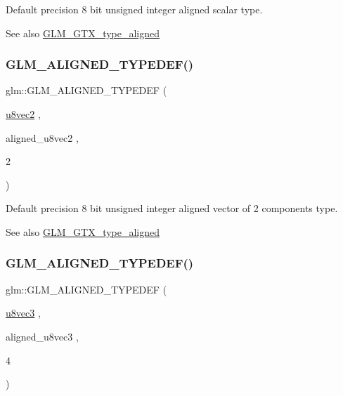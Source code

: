 Default precision 8 bit unsigned integer aligned scalar type. \begin{DoxySeeAlso}{See also}
\mbox{\hyperlink{group__gtx__type__aligned}{G\+L\+M\+\_\+\+G\+T\+X\+\_\+type\+\_\+aligned}} 
\end{DoxySeeAlso}
\mbox{\label{group__gtx__type__aligned_ga19837e6f72b60d994a805ef564c6c326}} 
\subsubsection{\texorpdfstring{GLM\_ALIGNED\_TYPEDEF()}{GLM\_ALIGNED\_TYPEDEF()}\hspace{0.1cm}{\footnotesize\ttfamily [122/209]}}
{\footnotesize\ttfamily glm\+::\+G\+L\+M\+\_\+\+A\+L\+I\+G\+N\+E\+D\+\_\+\+T\+Y\+P\+E\+D\+EF (\begin{DoxyParamCaption}\item[{\mbox{\hyperlink{group__gtc__type__precision_ga1c259b876f8757eb197b83a5fab476f0}{u8vec2}}}]{,  }\item[{aligned\+\_\+u8vec2}]{,  }\item[{2}]{ }\end{DoxyParamCaption})}

Default precision 8 bit unsigned integer aligned vector of 2 components type. \begin{DoxySeeAlso}{See also}
\mbox{\hyperlink{group__gtx__type__aligned}{G\+L\+M\+\_\+\+G\+T\+X\+\_\+type\+\_\+aligned}} 
\end{DoxySeeAlso}
\mbox{\label{group__gtx__type__aligned_ga9740cf8e34f068049b42a2753f9601c2}} 
\subsubsection{\texorpdfstring{GLM\_ALIGNED\_TYPEDEF()}{GLM\_ALIGNED\_TYPEDEF()}\hspace{0.1cm}{\footnotesize\ttfamily [123/209]}}
{\footnotesize\ttfamily glm\+::\+G\+L\+M\+\_\+\+A\+L\+I\+G\+N\+E\+D\+\_\+\+T\+Y\+P\+E\+D\+EF (\begin{DoxyParamCaption}\item[{\mbox{\hyperlink{group__gtc__type__precision_ga8262aeb120701de1b57773eb10be0f35}{u8vec3}}}]{,  }\item[{aligned\+\_\+u8vec3}]{,  }\item[{4}]{ }\end{DoxyParamCaption})}


